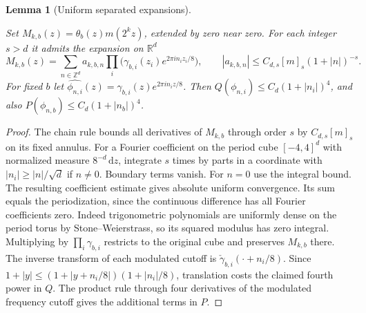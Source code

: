 \documentclass[11pt,letterpaper]{article}
\newtheorem{lemma}[theorem]{Lemma}
\theoremstyle{definition}
\newcommand{\R}{\mathbb R}
\newcommand{\dd}{\,\mathrm d}
\providecommand{\lean}[1]{}
\providecommand{\uses}[1]{}
\begin{document}
\begin{lemma}[Uniform separated expansions]\label{bp:mode-expansion}
\lean{TwistedParaproduct.modeExpansion}
Set \(M_{k,b}(z)=\theta_b(z)m(2^kz)\), extended by zero near zero.
For each integer \(s>d\) it admits the expansion on \(\R^d\)
\[
 M_{k,b}(z)=\sum_{n\in\mathbb Z^d} a_{k,b,n}
  \prod_i\bigl(\gamma_{b,i}(z_i)e^{2\pi i n_i z_i/8}\bigr),
 \qquad |a_{k,b,n}|\le C_{d,s}[m]_s(1+|n|)^{-s}.
\]
For fixed \(b\) let \(\widehat{\phi_{n,i}}(z)=
\gamma_{b,i}(z)e^{2\pi i n_i z/8}\). Then
\(Q(\phi_{n,i})\le C_d(1+|n_i|)^4\), and also
\(P(\phi_{n,b})\le C_d(1+|n_b|)^4\).
\end{lemma}
\begin{proof}
\uses{bp:cone-cutoffs}
The chain rule bounds all derivatives of \(M_{k,b}\) through order
\(s\) by \(C_{d,s}[m]_s\) on its fixed annulus. For a Fourier
coefficient on the period cube \([-4,4]^d\) with normalized measure
\(8^{-d}\dd z\), integrate \(s\) times by parts in a coordinate
with \(|n_i|\ge |n|/\sqrt d\) if \(n\ne0\). Boundary terms vanish.
For \(n=0\) use the integral bound. The resulting coefficient
estimate gives absolute uniform convergence. Its sum equals the
periodization, since the continuous difference has all Fourier
coefficients zero. Indeed trigonometric polynomials are uniformly
dense on the period torus by Stone--Weierstrass, so its squared
modulus has zero integral. Multiplying by \(\prod_i\gamma_{b,i}\)
restricts to the original cube and preserves \(M_{k,b}\) there.
The inverse transform of each modulated cutoff is
\(\check\gamma_{b,i}(\cdot+n_i/8)\). Since \(1+|y|\le
(1+|y+n_i/8|)(1+|n_i|/8)\), translation costs the claimed fourth
power in \(Q\). The product rule through four derivatives of the
modulated frequency cutoff gives the additional terms in \(P\).
\end{proof}
\end{document}
